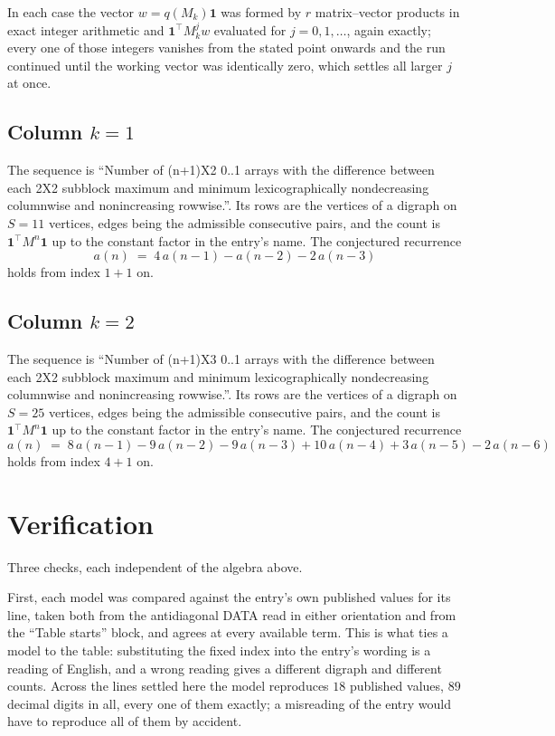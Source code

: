 \documentclass[11pt,a4paper]{article}
\theoremstyle{plain}
\theoremstyle{definition}
\begin{document}
In each case the vector $w=q(M_k)\mathbf{1}$ was formed by $r$ matrix--vector products in
exact integer arithmetic and $\mathbf{1}^{\!\top}M_k^{j}w$ evaluated for $j=0,1,\dots$,
again exactly; every one of those integers vanishes from the stated point onwards and the run
continued until the working vector was identically zero, which settles all larger $j$ at once.

\subsection*{Column $k$$=1$}
The sequence is ``Number of (n+1)X2 0..1 arrays with the difference between each 2X2 subblock maximum and minimum lexicographically nondecreasing columnwise and nonincreasing rowwise.''. Its rows are the vertices of a digraph on
$S=11$ vertices, edges being the admissible consecutive pairs, and the count is
$\mathbf{1}^{\!\top}M^{n}\mathbf{1}$ up to the constant factor in the entry's name.
The conjectured recurrence
\[
a(n)\;=\;4\,a(n-1) - a(n-2) - 2\,a(n-3)
\]
holds from index $1+1$ on.

\subsection*{Column $k$$=2$}
The sequence is ``Number of (n+1)X3 0..1 arrays with the difference between each 2X2 subblock maximum and minimum lexicographically nondecreasing columnwise and nonincreasing rowwise.''. Its rows are the vertices of a digraph on
$S=25$ vertices, edges being the admissible consecutive pairs, and the count is
$\mathbf{1}^{\!\top}M^{n}\mathbf{1}$ up to the constant factor in the entry's name.
The conjectured recurrence
\[
a(n)\;=\;8\,a(n-1) - 9\,a(n-2) - 9\,a(n-3) + 10\,a(n-4) + 3\,a(n-5) - 2\,a(n-6)
\]
holds from index $4+1$ on.

\section{Verification}

Three checks, each independent of the algebra above.

First, each model was compared against the entry's own published values for its line, taken
both from the antidiagonal DATA read in either orientation and from the ``Table starts''
block, and agrees at every available term. This is what ties a model to the table:
substituting the fixed index into the entry's wording is a reading of English, and a wrong
reading gives a different digraph and different counts. Across the lines settled here the
model reproduces $18$ published values, $89$ decimal digits in all, every one of
them exactly; a misreading of the entry would have to reproduce all of them by accident.
\end{document}
